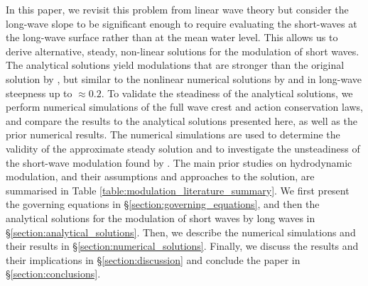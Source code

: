 \documentclass[lineno]{jfm}
\begin{document}
In this paper, we revisit this problem from linear wave theory but consider
the long-wave slope to be significant enough to require evaluating the
short-waves at the long-wave surface rather than at the mean water level.
This allows us to derive alternative, steady, non-linear solutions for the
modulation of short waves.
The analytical solutions yield modulations that are stronger than the original
solution by \citet{longuet1960changes}, but similar to the nonlinear numerical
solutions by \citet{longuet1987propagation} and \citet{zhang1990evolution} in
long-wave steepness up to $\approx 0.2$.
To validate the steadiness of the analytical solutions, we perform numerical
simulations of the full wave crest and action conservation laws, and compare
the results to the analytical solutions presented here, as well as the prior
numerical results.
The numerical simulations are used to determine the validity of the approximate
steady solution and to investigate the unsteadiness of the short-wave modulation
found by \citet{peureux2021unsteady}.
The main prior studies on hydrodynamic modulation, and their assumptions and
approaches to the solution, are summarised in Table
\ref{table:modulation_literature_summary}.
We first present the governing equations in \S\ref{section:governing_equations},
and then the analytical solutions for the modulation of short waves by long waves
in \S\ref{section:analytical_solutions}.
Then, we describe the numerical simulations and their results in
\S\ref{section:numerical_solutions}.
Finally, we discuss the results and their implications in
\S\ref{section:discussion} and conclude the paper in \S\ref{section:conclusions}.
\end{document}
